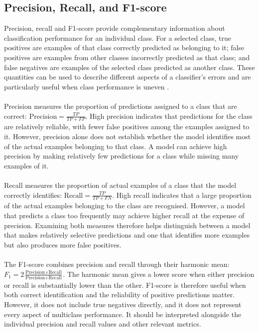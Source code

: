 \documentclass[12pt, a4paper]{report}
\let\oldsubsection\subsection
\renewcommand{\subsection}{%
    \Needspace{6\baselineskip}%
    \oldsubsection
}
\begin{document}
			\subsection{Precision, Recall, and F1-score}
				
				Precision, recall and F1-score provide complementary information about classification performance for an individual class. For a selected class, true positives are examples of that class correctly predicted as belonging to it; false positives are examples from other classes incorrectly predicted as that class; and false negatives are examples of the selected class predicted as another class. These quantities can be used to describe different aspects of a classifier's errors and are particularly useful when class performance is uneven \cite{Opitz2024ClassificationMetrics}.\\\\
				Precision measures the proportion of predictions assigned to a class that are correct: $\text{Precision}=\frac{TP}{TP+FP}$. High precision indicates that predictions for the class are relatively reliable, with fewer false positives among the examples assigned to it. However, precision alone does not establish whether the model identifies most of the actual examples belonging to that class. A model can achieve high precision by making relatively few predictions for a class while missing many examples of it.\\\\
				Recall measures the proportion of actual examples of a class that the model correctly identifies: $\text{Recall}=\frac{TP}{TP+FN}$. High recall indicates that a large proportion of the actual examples belonging to the class are recognised. However, a model that predicts a class too frequently may achieve higher recall at the expense of precision. Examining both measures therefore helps distinguish between a model that makes relatively selective predictions and one that identifies more examples but also produces more false positives.\\\\
				The F1-score combines precision and recall through their harmonic mean: $F_{1}=2\frac{\text{Precision}\times\text{Recall}}{\text{Precision}+\text{Recall}}$. The harmonic mean gives a lower score when either precision or recall is substantially lower than the other. F1-score is therefore useful when both correct identification and the reliability of positive predictions matter. However, it does not include true negatives directly, and it does not represent every aspect of multiclass performance. It should be interpreted alongside the individual precision and recall values and other relevant metrics.\\\\
\end{document}

